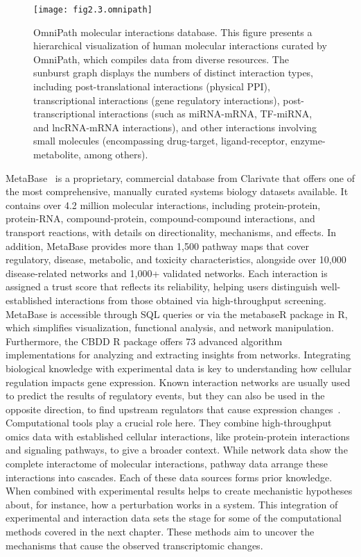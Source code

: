 \begin{figure}[htbp]
    \centering
    \texttt{[image: fig2.3.omnipath]}
    \caption[OmniPath molecular interactions database.]{OmniPath molecular interactions database. This figure presents a hierarchical visualization of human molecular interactions curated by OmniPath, which compiles data from diverse resources. The sunburst graph displays the numbers of distinct interaction types, including post-translational interactions (physical \gls{PPI}), transcriptional interactions (gene regulatory interactions), post-transcriptional interactions (such as miRNA-mRNA, \gls{TF}-miRNA, and lncRNA-mRNA interactions), and other interactions involving small molecules (encompassing drug-target, ligand-receptor, enzyme-metabolite, among others).}
    \label{fig:fig2.3.omnipath}
\end{figure}

MetaBase~\cite{RN33} is a proprietary, commercial database from Clarivate that offers one of the most comprehensive, manually curated systems biology datasets available. It contains over 4.2 million molecular interactions, including protein-protein, protein-RNA, compound-protein, compound-compound interactions, and transport reactions, with details on directionality, mechanisms, and effects. In addition, MetaBase provides more than 1,500 pathway maps that cover regulatory, disease, metabolic, and toxicity characteristics, alongside over 10,000 disease-related networks and 1,000+ validated networks. Each interaction is assigned a trust score that reflects its reliability, helping users distinguish well-established interactions from those obtained via high-throughput screening. MetaBase is accessible through SQL queries or via the metabaseR package in R, which simplifies visualization, functional analysis, and network manipulation. Furthermore, the CBDD R package offers 73 advanced algorithm implementations for analyzing and extracting insights from networks.
Integrating biological knowledge with experimental data is key to understanding how cellular regulation impacts gene expression.  Known interaction networks are usually used to predict the results of regulatory events, but they can also be used in the opposite direction, to find upstream regulators that cause expression changes~\cite{RN131}. Computational tools play a crucial role here. They combine high-throughput omics data with established cellular interactions, like protein-protein interactions and signaling pathways, to give a broader context. While network data show the complete interactome of molecular interactions, pathway data arrange these interactions into cascades. Each of these data sources forms prior knowledge. 
When combined with experimental results helps to create mechanistic hypotheses about, for instance, how a perturbation works in a system. This integration of experimental and interaction data sets the stage for some of the computational methods covered in the next chapter. These methods aim to uncover the mechanisms that cause the observed transcriptomic changes.

